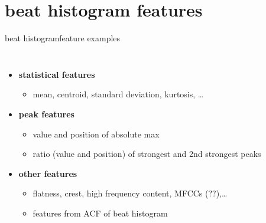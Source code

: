         \section[features]{beat histogram features}
            \begin{frame}{beat histogram}{feature examples}
                \vspace{-5mm}
                \begin{columns}
                \begin{itemize}
                    \item	\textbf{statistical features} 
                        \begin{itemize}
                            \item mean, centroid, standard deviation, kurtosis, \ldots
                        \end{itemize}
                    \smallskip
                    \item<2->   \textbf{peak features}
                        \begin{itemize}
                            \item   value and position of absolute max
                            \item   ratio (value and position) of strongest and 2nd strongest peaks
                        \end{itemize}
                    \smallskip
                    \item<3->	\textbf{other features}
                        \begin{itemize}
                            \item   flatness, crest, high frequency content, MFCCs (??),\ldots
                            \item   features from ACF of beat histogram
                            
                        \end{itemize}
                \end{itemize}
                \end{columns}   
                
                
            \end{frame}

